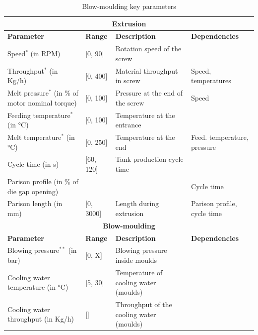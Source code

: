 \begin{landscape}
\begin{table}[]
\caption{Blow-moulding key
parameters}
\label{tab:key_parameters}
\begin{small}
\begin{tabular}{@{}llll@{}}
\toprule
\multicolumn{4}{c}{\textbf{Extrusion}} \\
\midrule
\textbf{Parameter}                     & \textbf{Range}   & \textbf{Description}                                    & \textbf{Dependencies} \\ 
\midrule
Speed$^*$  (in RPM)                               & [0, 90]       & Rotation speed of the screw                               &              \\ 
Throughput$^*$ (in Kg/h)                              & [0, 400]      & Material throughput in screw                 &  Speed, temperatures            \\ 
Melt pressure$^*$ (in \% of motor nominal torque)    & [0, 100]      & Pressure at the end of the screw                 & Speed             \\
Feeding temperature$^*$ (in °C)                               & [0, 100]      & Temperature at the entrance      &              \\
Melt temperature$^*$  (in °C)                                & [0, 250]      & Temperature at the end          &    Feed. temperature, pressure          \\
Cycle time   (in s)                                 & [60, 120]     & Tank production cycle time                                &              \\
Parison profile  (in \% of die gap opening)         &               &                                                &  Cycle time            \\
Parison length (in mm)                                & [0, 3000]     & Length during extrusion     &   Parison profile, cycle time    \\ 
\midrule
\multicolumn{4}{c}{\textbf{Blow-moulding}} \\
\midrule
\textbf{Parameter}                     & \textbf{Range}   & \textbf{Description}    & \textbf{Dependencies} \\ 
\midrule
Blowing pressure$^{**}$ (in bar)      &  [0, X]              & Blowing pressure inside moulds                                               &              \\
Cooling water temperature (in °C)     &  [5, 30]               & Temperature of cooling water (moulds)                                               &               \\
Cooling water throughput (in Kg/h)    &    []               & Throughput of the cooling water (moulds)                                               &              \\ 
\bottomrule
\end{tabular}
\end{small}


\end{table}
\end{landscape}
